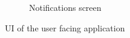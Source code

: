 \documentclass[conference]{IEEEtran}
\begin{document}
\begin{figure}[t]
\begin{subfigure}{0.24\textwidth}
	\caption{Notifications screen}
	\label{fig:screen4}
	\end{subfigure}
\caption{UI of the user facing application}\label{fig:screens}
\end{figure}
\end{document}
